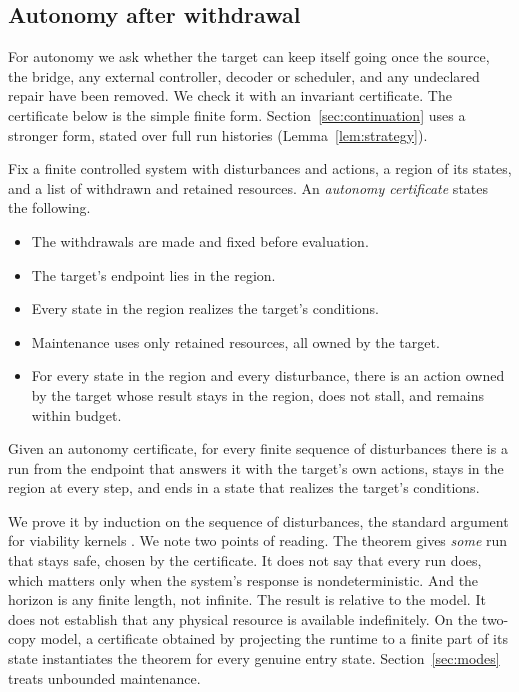 \subsection{Autonomy after withdrawal}
\label{sec:autonomy}

For autonomy we ask whether the target can keep itself going once the source, the
bridge, any external controller, decoder or scheduler, and any undeclared
repair have been removed. We check it with an invariant certificate. The certificate below is the
simple finite form. Section~\ref{sec:continuation} uses a stronger form,
stated over full run histories (Lemma~\ref{lem:strategy}).

\begin{definition}
\label{def:autonomy}
Fix a finite controlled system with disturbances and actions, a region of its
states, and a list of withdrawn and retained resources. An \emph{autonomy
certificate} states the following.
\begin{itemize}
\item The withdrawals are made and fixed before evaluation.
\item The target's endpoint lies in the region.
\item Every state in the region realizes the target's conditions.
\item Maintenance uses only retained resources, all owned by the target.
\item For every state in the region and every disturbance, there is an action
owned by the target whose result stays in the region, does not stall, and
remains within budget.
\end{itemize}
\end{definition}

\begin{theorem}
\label{thm:autonomy}
Given an autonomy certificate, for every finite sequence of disturbances there
is a run from the endpoint that answers it with the target's own actions, stays
in the region at every step, and ends in a state that realizes the target's
conditions.
\end{theorem}

We prove it by induction on the sequence of disturbances, the standard argument
for viability kernels \citep{Aubin1991, Blanchini1999}. We note two points of reading. The theorem gives \emph{some} run that stays safe, chosen by the
certificate. It does not say that every run does, which matters only when the
system's response is nondeterministic. And the horizon is any finite length,
not infinite. The result is relative to the model. It does not establish that
any physical resource is available indefinitely. On the two-copy model, a certificate obtained by projecting the
runtime to a finite part of its state instantiates the theorem for every
genuine entry state. Section~\ref{sec:modes} treats unbounded maintenance.

